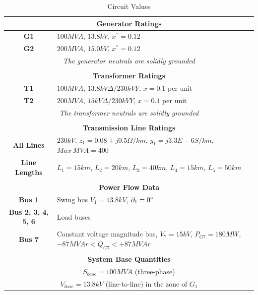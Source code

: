 \documentclass[12pt]{article}
\begin{document}
        \begin{table}[H]
            \centering
            \begin{tabular}{|c|p{13cm}|}
                \hline
                \multicolumn{2}{|c|}{\textbf{Generator Ratings}}\\\hline
                \textbf{G1}&$100MVA$, $13.8kV$, $x^{''}=0.12$\\\hline
                \textbf{G2}&$200MVA$, $15.0kV$, $x^{''}=0.12$\\\hline
                \multicolumn{2}{|c|}{\textit{The generator neutrals are solidly grounded}}\\\hline
                \multicolumn{2}{c}{}\\\hline
                \multicolumn{2}{|c|}{\textbf{Transformer Ratings}}\\\hline
                \textbf{T1}&$100MVA$, $13.8kV\Delta/230 kVY$, $x=0.1$ per unit\\\hline
                \textbf{T2}&$200MVA$, $15kV\Delta/230 kVY$, $x=0.1$ per unit\\\hline
                \multicolumn{2}{|c|}{\textit{The transformer neutrals are solidly grounded}}\\\hline
                \multicolumn{2}{c}{}\\\hline
                \multicolumn{2}{|c|}{\textbf{Transmission Line Ratings}}\\\hline
                \textbf{All Lines}&$230kV$, $z_1=0.08+j0.5\Omega/km$, $y_1=j3.3E-6 S/km$, $Max\ MVA=400$\\\hline
                \textbf{Line Lengths}&$L_1=15km$, $L_2=20km$, $L_3=40km$, $L_4=15km$, $L_5=50km$\\\hline
                \multicolumn{2}{c}{}\\\hline
                \multicolumn{2}{|c|}{\textbf{Power Flow Data}}\\\hline
                \textbf{Bus 1}&Swing bus $V_1=13.8kV$, $\partial_1=0\degree$\\\hline
                \textbf{Bus 2, 3, 4, 5, 6}&Load buses\\\hline
                \textbf{Bus 7}&Constant voltage magnitude bus, $V_7=15kV$, $P_{G7}=180MW$, $-87MVAr<Q_{G7}<+87MVAr$\\\hline
                \multicolumn{2}{c}{}\\\hline
                \multicolumn{2}{|c|}{\textbf{System Base Quantities}}\\\hline
                \multicolumn{2}{|c|}{$S_{base}=100MVA$ (three-phase)}\\\hline
                \multicolumn{2}{|c|}{$V_{base}=13.8kV$ (line-to-line) in the zone of $G_1$}\\\hline
            \end{tabular}
            \caption{Circuit Values}
        \end{table}
        \newpage
\end{document}
